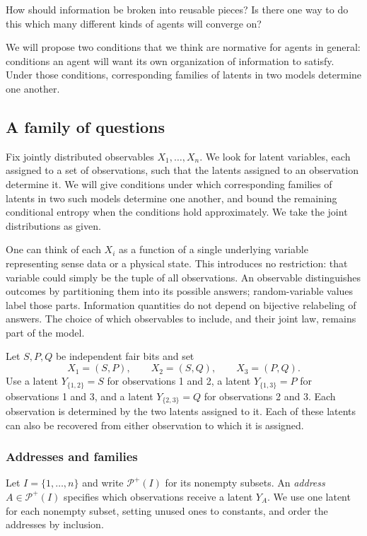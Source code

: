 \documentclass[11pt]{article}
\newcommand{\PI}{\mathcal{P}^{+}(I)}
\begin{document}
How should information be broken into reusable pieces? Is there one way to do
this which many different kinds of agents will converge on?

We will propose two conditions that we think are normative for agents in
general: conditions an agent will want its own organization of information to
satisfy. Under those conditions, corresponding families of latents in two models
determine one another.

\subsection{A family of questions}
\label{sec:questions}
Fix jointly distributed observables $X_1,\ldots,X_n$. We look for latent
variables, each assigned to a set of observations, such that the latents
assigned to an observation determine it.
We will give conditions under which corresponding families of latents in two
such models determine one another, and bound the remaining conditional entropy
when the conditions hold approximately. We take the joint distributions as given.

\begin{remark}
One can think of each $X_i$ as a function of a single underlying variable
representing sense data or a physical state. This introduces no restriction:
that variable could simply be the tuple of all observations. An observable distinguishes outcomes by
partitioning them into its possible answers; random-variable values label those
parts. Information quantities do not depend on bijective relabeling of answers.
The choice of which observables to include, and their joint law, remains part
of the model.
\end{remark}

\begin{example}
\label{eg:bits}
Let $S,P,Q$ be independent fair bits and set
\[
 X_1=(S,P),\qquad X_2=(S,Q),\qquad X_3=(P,Q).
\]
Use a latent $Y_{\{1,2\}}=S$ for observations 1 and 2, a latent
$Y_{\{1,3\}}=P$ for observations 1 and 3, and a latent $Y_{\{2,3\}}=Q$
for observations 2 and 3. Each observation is determined by the two latents
assigned to it. Each of these latents can also be recovered from either
observation to which it is assigned.
\end{example}

\subsubsection{Addresses and families}
Let $I=\{1,\ldots,n\}$ and write $\PI$ for its nonempty subsets.
An \emph{address} $A\in\PI$ specifies which observations receive a latent
$Y_A$. We use one latent for each nonempty subset, setting unused ones to
constants, and order the addresses by inclusion.
\end{document}

